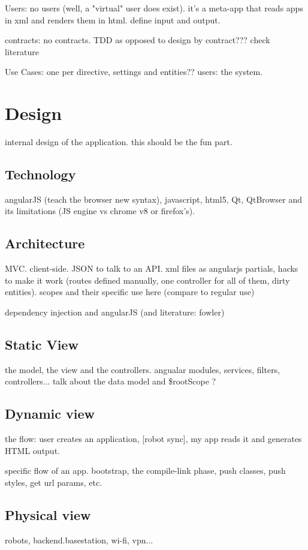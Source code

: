 Users: no users (well, a "virtual" user does exist). it's a meta-app that reads apps in xml and renders them in html. define input and output.

contracts: no contracts. TDD as opposed to design by contract??? check literature

Use Cases: one per directive, settings and entities?? users: the system.

\chapter{Design}
internal design of the application. this should be the fun part.
\section{Technology}
angularJS (teach the browser new syntax), javascript, html5, Qt, QtBrowser and its limitations (JS engine vs chrome v8 or firefox's).

\section{Architecture}
MVC. client-side. JSON to talk to an API. xml files as angularjs partials, hacks to make it work (routes defined manually, one controller for all of them, dirty entities). scopes and their specific use here (compare to regular use)

dependency injection and angularJS (and literature: fowler)

\section{Static View}
the model, the view and the controllers. angualar modules, services, filters, controllers...
talk about the data model and \$rootScope ?

\section{Dynamic view}
the flow: user creates an application, [robot sync], my app reads it and generates HTML output.

specific flow of an app. bootstrap, the compile-link phase, push classes, push styles, get url params, etc.

\section{Physical view}
robots, backend.basestation, wi-fi, vpn...

